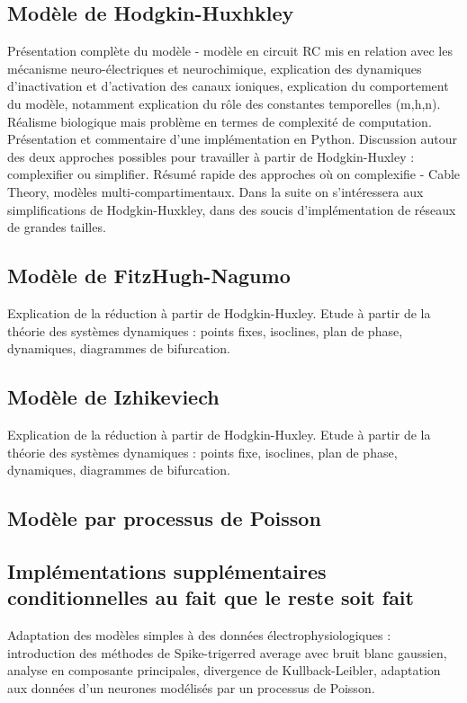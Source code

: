 \documentclass[12pt]{scrartcl}
\begin{document}
\subsection{Modèle de Hodgkin-Huxhkley} Présentation complète du modèle - modèle en circuit RC mis en relation avec les mécanisme neuro-électriques et neurochimique, explication des dynamiques d'inactivation et d'activation des canaux ioniques, explication du comportement du modèle, notamment explication du rôle des constantes temporelles (m,h,n). Réalisme biologique mais problème en termes de complexité de computation. Présentation et commentaire d'une implémentation en Python. Discussion autour des deux approches possibles pour travailler à partir de Hodgkin-Huxley : complexifier ou simplifier. Résumé rapide des approches où on complexifie - Cable Theory, modèles multi-compartimentaux. Dans la suite on s'intéressera aux simplifications de Hodgkin-Huxkley, dans des soucis d'implémentation de réseaux de grandes tailles.

\subsection{Modèle de FitzHugh-Nagumo} Explication de la réduction à partir de Hodgkin-Huxley. Etude à partir de la théorie des systèmes dynamiques : points fixes, isoclines, plan de phase, dynamiques, diagrammes de bifurcation.

\subsection{Modèle de Izhikeviech} Explication de la réduction à partir de Hodgkin-Huxley. Etude à partir de la théorie des systèmes dynamiques : points fixe, isoclines, plan de phase, dynamiques, diagrammes de bifurcation.

\subsection{Modèle par processus de Poisson} 

\subsection{Implémentations supplémentaires conditionnelles au fait que le reste soit fait} Adaptation des modèles simples à des données électrophysiologiques : introduction des méthodes de Spike-trigerred average avec bruit blanc gaussien, analyse en composante principales, divergence de Kullback-Leibler, adaptation aux données d'un neurones modélisés par un processus de Poisson.
\end{document}
